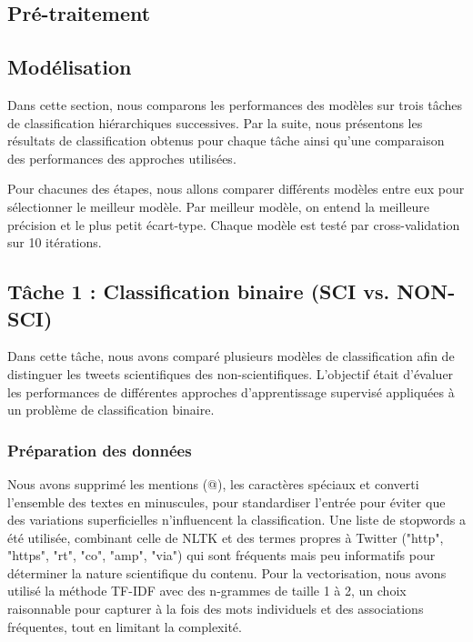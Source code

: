 \subsection{Pré-traitement}\label{subsec:pre-traitement}


\subsection{Modélisation}\label{subsec:modelisation}
Dans cette section, nous comparons les performances des modèles sur trois tâches de classification hiérarchiques successives.
Par la suite, nous présentons les résultats de classification obtenus pour chaque tâche ainsi qu’une comparaison des performances des approches utilisées.

\noindent Pour chacunes des étapes, nous allons comparer différents modèles entre eux pour sélectionner le meilleur modèle.
Par meilleur modèle, on entend la meilleure précision et le plus petit écart-type.
Chaque modèle est testé par cross-validation sur 10 itérations.

\subsection{Tâche 1 : Classification binaire ({SCI} vs. {NON-SCI})}\label{subsec:modele-1:-sci-vs-non-sci}
Dans cette tâche, nous avons comparé plusieurs modèles de classification afin de distinguer les tweets scientifiques des non-scientifiques.
L’objectif était d’évaluer les performances de différentes approches d’apprentissage supervisé appliquées à un problème de classification binaire.

\subsubsection{Préparation des données}
Nous avons supprimé les mentions (@), les caractères spéciaux et converti l’ensemble des textes en minuscules, pour standardiser l’entrée pour éviter que des variations superficielles n’influencent la classification.
Une liste de stopwords a été utilisée, combinant celle de NLTK et des termes propres à Twitter ("http", "https", "rt", "co", "amp", "via") qui sont fréquents mais peu informatifs pour déterminer la nature scientifique du contenu.
Pour la vectorisation, nous avons utilisé la méthode TF-IDF avec des n-grammes de taille 1 à 2, un choix raisonnable pour capturer à la fois des mots individuels et des associations fréquentes, tout en limitant la complexité.

